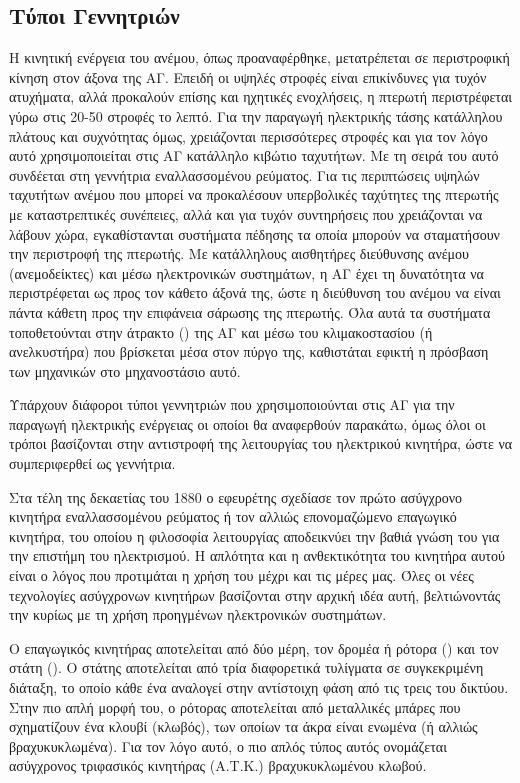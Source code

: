 \documentclass[12pt]{report}
\begin{document}
\subsection{Τύποι Γεννητριών}
Η κινητική ενέργεια του ανέμου, όπως προαναφέρθηκε, μετατρέπεται σε περιστροφική κίνηση στον άξονα της ΑΓ. Επειδή οι υψηλές στροφές είναι επικίνδυνες για τυχόν ατυχήματα, αλλά προκαλούν επίσης και ηχητικές ενοχλήσεις, η πτερωτή 
περιστρέφεται γύρω στις 20-50 στροφές το λεπτό. Για την παραγωγή ηλεκτρικής τάσης κατάλληλου πλάτους και συχνότητας όμως, χρειάζονται περισσότερες στροφές και για τον λόγο αυτό χρησιμοποιείται στις ΑΓ κατάλληλο κιβώτιο ταχυτήτων. 
Με τη σειρά του αυτό συνδέεται στη γεννήτρια εναλλασσομένου ρεύματος. Για τις περιπτώσεις υψηλών ταχυτήτων ανέμου που μπορεί να προκαλέσουν υπερβολικές ταχύτητες της πτερωτής με καταστρεπτικές συνέπειες, αλλά και για τυχόν 
συντηρήσεις που χρειάζονται να λάβουν χώρα, εγκαθίστανται συστήματα πέδησης τα οποία μπορούν να σταματήσουν την περιστροφή της πτερωτής. Με κατάλληλους αισθητήρες διεύθυνσης ανέμου (ανεμοδείκτες) και μέσω ηλεκτρονικών συστημάτων, 
η ΑΓ έχει τη δυνατότητα να περιστρέφεται ως προς τον κάθετο άξονά της, ώστε η διεύθυνση του ανέμου να είναι πάντα κάθετη προς την επιφάνεια σάρωσης της πτερωτής. Όλα αυτά τα συστήματα τοποθετούνται στην άτρακτο 
({}) της ΑΓ και μέσω του κλιμακοστασίου (ή ανελκυστήρα) που βρίσκεται μέσα στον πύργο της, καθιστάται εφικτή η πρόσβαση των μηχανικών στο μηχανοστάσιο αυτό.

Υπάρχουν διάφοροι τύποι γεννητριών που χρησιμοποιούνται στις ΑΓ για την παραγωγή ηλεκτρικής ενέργειας οι οποίοι θα αναφερθούν παρακάτω, όμως όλοι οι τρόποι βασίζονται στην αντιστροφή της λειτουργίας του ηλεκτρικού κινητήρα, 
ώστε να συμπεριφερθεί ως γεννήτρια. 

Στα τέλη της δεκαετίας του 1880 ο εφευρέτης {} σχεδίασε τον πρώτο ασύγχρονο κινητήρα εναλλασσομένου ρεύματος ή τον αλλιώς επονομαζώμενο επαγωγικό κινητήρα, του οποίου η φιλοσοφία λειτουργίας αποδεικνύει την
βαθιά γνώση του {} για την επιστήμη του ηλεκτρισμού. 
Η απλότητα και η ανθεκτικότητα του κινητήρα αυτού είναι ο λόγος που προτιμάται η χρήση του μέχρι και τις μέρες μας. 
Όλες οι νέες τεχνολογίες ασύγχρονων κινητήρων βασίζονται στην αρχική ιδέα αυτή, βελτιώνοντάς την κυρίως με τη χρήση προηγμένων ηλεκτρονικών συστημάτων.

Ο επαγωγικός κινητήρας αποτελείται από δύο μέρη, τον δρομέα ή ρότορα ({}) και τον στάτη ({}). Ο στάτης αποτελείται από τρία διαφορετικά τυλίγματα σε συγκεκριμένη διάταξη, το οποίο κάθε 
ένα αναλογεί στην αντίστοιχη φάση από τις τρεις του δικτύου. Στην πιο απλή μορφή του, ο ρότορας αποτελείται από μεταλλικές μπάρες που σχηματίζουν ένα κλουβί (κλωβός), των οποίων τα άκρα είναι ενωμένα (ή αλλιώς βραχυκυκλωμένα). 
Για τον λόγο αυτό, ο πιο απλός τύπος αυτός ονομάζεται ασύγχρονος τριφασικός κινητήρας (Α.Τ.Κ.) βραχυκυκλωμένου κλωβού. 
\end{document}

